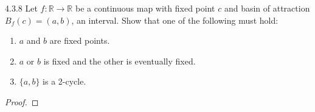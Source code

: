 \begin{problem}{4.3.8}
  Let $f: \mathbb{R} \to \mathbb{R}$ be a continuous map with fixed point $c$
  and basin of attraction $B_f(c) = (a, b)$, an interval. Show that one of the following must hold:
  \begin{enumerate}
    \item $a$ and $b$ are fixed points.
    \item $a$ or $b$ is fixed and the other is eventually fixed.
    \item $\{a, b\}$ is a 2-cycle.
  \end{enumerate}
\end{problem}

\begin{proof}
\end{proof}
\newpage
